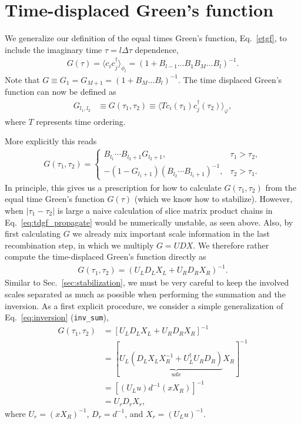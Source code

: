\documentclass[%
 reprint,
superscriptaddress,
citeautoscript,
showpacs,
 amsmath,amssymb,
 aps,
 prb,
longbibliography,
]{revtex4-2}
\begin{document}
\section{Time-displaced Green's function}\label{sec:TDGF}
We generalize our definition of the equal times Green's function, Eq.~\ref{etgf}, to include the imaginary time $\tau = l \Delta \tau$ dependence,
\begin{align}
G(\tau) = \langle c_{i} c_{j}^\dagger \rangle_{\phi_l} = \left( 1 + B_{l-1}\dots B_1 B_M \dots B_l \right)^{-1}.
\end{align}
Note that $ G \equiv G_1 = G_{M+1} = \left( 1 + B_M \dots B_l \right)^{-1} $. The time displaced Green's function can now be defined as \cite{Santos2003, Assaad2002a}
\begin{align*}
	G_{l_1,l_2} &\equiv G(\tau_1, \tau_2) \equiv \langle T c_i(\tau_1) c_j^\dagger(\tau_2) \rangle_\varphi,
\end{align*}
where $T$ represents time ordering.

More explicitly this reads
\begin{align}
	G(\tau_1, \tau_2) = \begin{cases}
	B_{l_1} \cdots B_{l_2 + 1} G_{l_2 + 1}, &\tau_1 > \tau_2,\\
	- \left( 1 - G_{l_1 + 1} \right) \left( B_{l_2} \cdots B_{l_1 + 1}\right)^{-1}, &\tau_2 > \tau_1.
	\end{cases} \label{eq:tdgf_propagate}
\end{align}
In principle, this gives us a prescription for how to calculate $G(\tau_1, \tau_2)$ from the equal time Green's function $G(\tau)$ (which we know how to stabilize). However, when $|\tau_1 - \tau_2|$ is large a naive calculation of slice matrix product chains in Eq.~\ref{eq:tdgf_propagate} would be numerically unstable, as seen above. Also, by first calculating $G$ we already mix important scale information in the last recombination step, in which we multiply $G = UDX$. We therefore rather compute the time-displaced Green's function directly as
\begin{align}
	G(\tau_1, \tau_2) = (U_L D_L X_L + U_R D_R X_R)^{-1}.
\end{align}
Similar to Sec.~\ref{sec:stabilization}, we must be very careful to keep the involved scales separated as much as possible when performing the summation and the inversion.
As a first explicit procedure, we consider a simple generalization of Eq.~\ref{eq:inversion} (\texttt{inv\_sum}),
\begin{align}
	G(\tau_1, \tau_2) &= [U_L D_L X_L + U_R D_R X_R]^{-1} \nonumber\\
	&= [U_L \underbrace{(D_L X_L X_R^{-1} + U_L^\dagger U_R D_R)}_{udx} X_R ]^{-1} \nonumber\\
	&= [(U_L u) d^{-1} (x X_R)]^{-1} \label{eq:inversion_tdgf}\\
	&= U_r D_r X_r, \nonumber 
\end{align}
where $U_r = (x X_R)^{-1}$, $D_r = d^{-1}$, and $X_r = (U_L u)^{-1}$.
\end{document}

